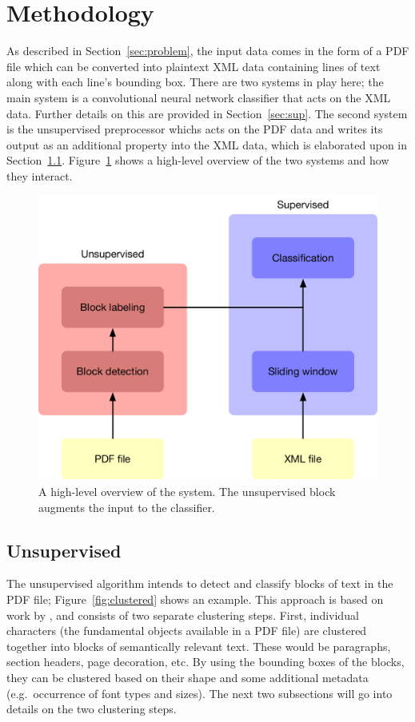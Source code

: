 \section{Methodology}
\label{sec:method}

As described in Section~\ref{sec:problem}, the input data comes in the form of a
PDF file which can be converted into plaintext XML data containing lines of text
along with each line's bounding box. There are two systems in play here; the
main system is a convolutional neural network classifier that acts on the XML
data. Further details on this are provided in Section~\ref{sec:sup}. The second
system is the unsupervised preprocessor whichs acts on the PDF data and writes
its output as an additional property into the XML data, which is elaborated upon
in Section~\ref{sec:unsup}. Figure~\ref{fig:overview} shows a high-level
overview of the two systems and how they interact.

\begin{figure}[htb]
  \centering
  \includegraphics[width=\textwidth]{figures/layout.pdf}
  \caption{A high-level overview of the system. The unsupervised block augments
  the input to the classifier.}
  \label{fig:overview}
\end{figure}

\subsection{Unsupervised}
\label{sec:unsup}
The unsupervised algorithm intends to detect and classify blocks of text in the
PDF file; Figure~\ref{fig:clustered} shows an example. This approach is based on
work by \textcite{klampfl2014unsupervised}, and consists of two separate
clustering steps. First, individual characters (the fundamental objects
available in a PDF file) are clustered together into blocks of semantically
relevant text. These would be paragraphs, section headers, page decoration, etc.
By using the bounding boxes of the blocks, they can be clustered based on their
shape and some additional metadata (e.g.\ occurrence of font types and sizes).
The next two subsections will go into details on the two clustering steps.

